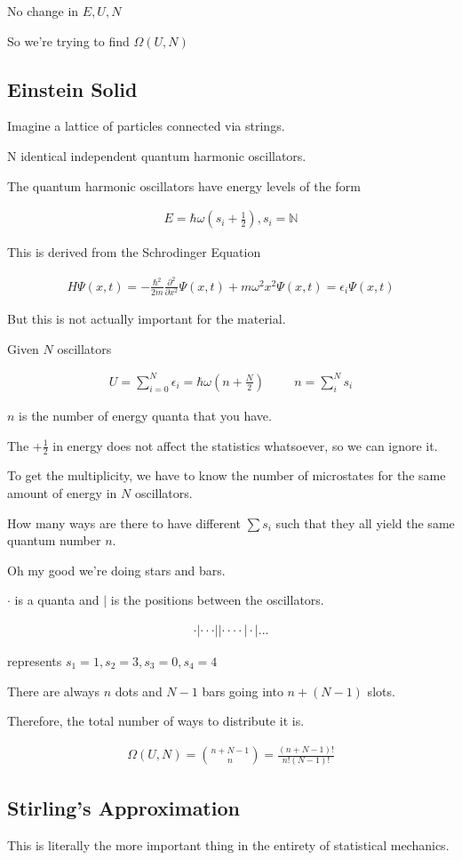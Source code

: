 \documentclass[fleqn]{report}
\newcommand{\hp}{\hspace{1cm}}
\newcommand{\del}{\partial}
\newcommand{\equations} [1] {
\begin{gather*}
#1
\end{gather*}
}
\begin{document}
No change in $E, U, N$

So we're trying to find 
$\Omega(U, N)$

\subsection{Einstein Solid}
Imagine a lattice of particles connected via strings. 

N identical independent quantum harmonic oscillators. 

The quantum harmonic oscillators have energy levels of the form 
\equations{
    E 
    =
    \hbar \omega 
    (s_i + \frac{1}{2})
    , 
    s_i
    =
    \mathbb{N}
}

This is derived from the Schrodinger Equation 
\equations{
    H \Psi(x, t)
    =
    - \frac{\hbar^2}{2m}
    \frac{\del^2}{\del x^2}
    \Psi(x, t)
    +
    m \omega^2 x^2 \Psi(x, t)
    =
    \epsilon_i \Psi(x, t)
}

But this is not actually important for the material.

Given $N$ oscillators 
\equations{
    U 
    =
    \sum^N_{i=0}
    \epsilon_i
    =
    \hbar \omega (n + \frac{N}{2})
    \hp 
    n 
    =
    \sum^N_i
    s_i
}
$n$ is the number of energy quanta that you have. 

The $+ \frac{1}{2}$ in energy does not affect the statistics whatsoever, 
so we can ignore it. 

To get the multiplicity, we have to know the number of microstates for 
the same amount of energy in $N$ oscillators. 

How many ways are there to have different $\sum s_i$ such that they all 
yield the same quantum number $n$.

Oh my good we're doing stars and bars. 

$\cdot$ is a quanta and $|$ is the positions between the oscillators.

\equations{
    \cdot 
    |
    \cdot 
    \cdot 
    \cdot 
    |
    |
    \cdot 
    \cdot 
    \cdot 
    \cdot 
    |
    \cdot 
    |
    ...
}
represents $s_1 = 1, s_2 = 3, s_3 = 0, s_4 = 4$

There are always $n$ dots and $N-1$ bars going 
into $n + (N - 1)$ slots.

Therefore, the total number of ways to distribute it is. 

\equations{
    \Omega(U, N)
    =
    {n + N - 1 \choose n}
    =
    \frac{(n + N - 1)!}{n! (N - 1)!}
}

\subsection{Stirling's Approximation}
This is literally the more important thing in the 
entirety of statistical mechanics.
\end{document}
